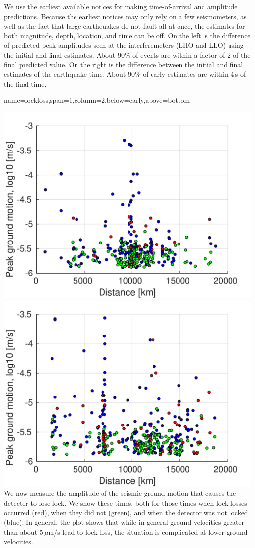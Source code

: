 \documentclass[a0paper,portrait]{baposter}
\begin{document}
\begin{poster}
{We use the earliest available notices for making time-of-arrival and amplitude predictions.
Because the earliest notices may only rely on a few seismometers, as well as the fact that large earthquakes do not fault all at once, the estimates for both magnitude, depth, location, and time can be off.
On the left is the difference of predicted peak amplitudes seen at the interferometers (LHO and LLO) using the initial and final estimates. About 90\% of events are within a factor of 2 of the final predicted value. On the right is the difference between the initial and final estimates of the earthquake time. About 90\% of early estimates are within 4\,s of the final time.
}

{name=lockloss,span=1,column=2,below=early,above=bottom}{

 \includegraphics[width=0.49\linewidth]{plots/lockloss_vel_distance_LHO.pdf}
  \includegraphics[width=0.49\linewidth]{plots/lockloss_vel_distance_LLO.pdf}
We now measure the amplitude of the seismic ground motion that causes the detector to lose lock.
We show these times, both for those times when lock losses occurred (red), when they did not (green), and when the detector was not locked (blue). 
In general, the plot shows that while in general ground velocities greater than about 5\,$\mu$m/s lead to lock loss, the situation is complicated at lower ground velocities. \\

}
\end{poster}
\end{document}

